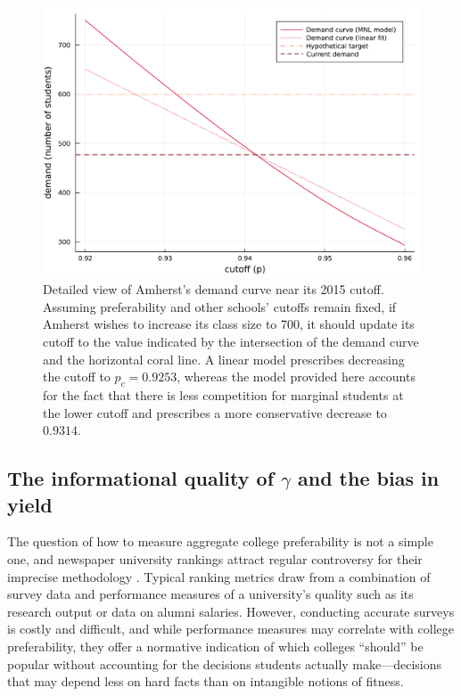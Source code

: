 \documentclass[12pt]{article}
\numberwithin{equation}{subsection}
\theoremstyle{definition}
\begin{document}
\begin{figure}
\begin{center}\includegraphics[width=\linewidth, ]{singlescoreplots/single-demand-curve.pdf}\end{center}
\captionsetup{singlelinecheck=off}
    \caption[.]{Detailed view of Amherst's demand curve near its 2015 cutoff. Assuming preferability and other schools' cutoffs remain fixed, if Amherst wishes to increase its class size to 700, it should update its cutoff to the value indicated by the intersection of the demand curve and the horizontal coral line. A linear model prescribes decreasing the cutoff to $p_c = 0.9253$, whereas the model provided here accounts for the fact that there is less competition for marginal students at the lower cutoff and prescribes a more conservative decrease to $0.9314$. }
\label{caltech-demand-curve}
\end{figure}










\subsection{The informational quality of $\gamma$ and the bias in yield}
The question of how to measure aggregate college preferability is not a simple one, and newspaper university rankings attract regular controversy for their imprecise methodology \parencite[][]{intlrankingsandconflicts}. Typical ranking metrics draw from a combination of survey data and performance measures of a university's quality such as its research output or data on alumni salaries. However, conducting accurate surveys is costly and difficult, and while performance measures may correlate with college preferability, they offer a normative indication of which colleges ``should'' be popular without accounting for the decisions students actually make---decisions that may depend less on hard facts than on intangible notions of fitness.
\end{document}
